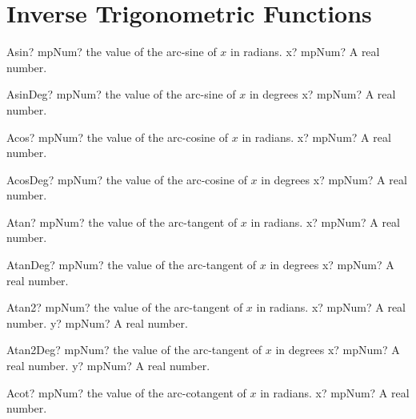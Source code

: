 \documentclass[12pt,a4paper,openany]{book}
\begin{document}
\section{Inverse Trigonometric Functions}

\begin{mpFunctionsExtract}
\mpFunctionOne
{Asin? mpNum? the value of the arc-sine of $x$ in radians.}
{x? mpNum? A real number.}
\end{mpFunctionsExtract}

\begin{mpFunctionsExtract}
\mpFunctionOne
{AsinDeg? mpNum? the value of the arc-sine of $x$ in degrees}
{x? mpNum? A real number.}
\end{mpFunctionsExtract}

\begin{mpFunctionsExtract}
\mpFunctionOne
{Acos? mpNum? the value of the arc-cosine of $x$ in radians.}
{x? mpNum? A real number.}
\end{mpFunctionsExtract}

\begin{mpFunctionsExtract}
\mpFunctionOne
{AcosDeg? mpNum? the value of the arc-cosine of $x$ in degrees}
{x? mpNum? A real number.}
\end{mpFunctionsExtract}

\begin{mpFunctionsExtract}
\mpFunctionOne
{Atan? mpNum? the value of the arc-tangent of $x$ in radians.}
{x? mpNum? A real number.}
\end{mpFunctionsExtract}

\begin{mpFunctionsExtract}
\mpFunctionOne
{AtanDeg? mpNum? the value of the arc-tangent of $x$ in degrees}
{x? mpNum? A real number.}
\end{mpFunctionsExtract}

\begin{mpFunctionsExtract}
\mpFunctionTwo
{Atan2? mpNum? the value of the arc-tangent of $x$ in radians.}
{x? mpNum? A real number.}
{y? mpNum? A real number.}
\end{mpFunctionsExtract}

\begin{mpFunctionsExtract}
\mpFunctionTwo
{Atan2Deg? mpNum? the value of the arc-tangent of $x$ in degrees}
{x? mpNum? A real number.}
{y? mpNum? A real number.}
\end{mpFunctionsExtract}

\begin{mpFunctionsExtract}
\mpFunctionOne
{Acot? mpNum? the value of the arc-cotangent of $x$ in radians.}
{x? mpNum? A real number.}
\end{mpFunctionsExtract}
\end{document}
